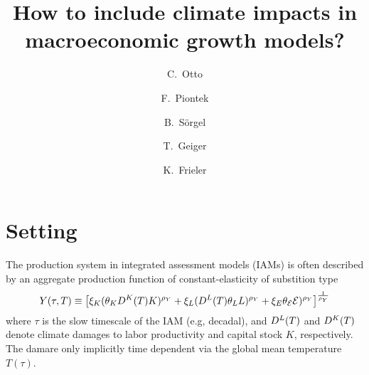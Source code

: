 \documentclass[preprint,3p,authoryear]{elsarticle}
\begin{document}

\begin{frontmatter}

  \title{How to include climate impacts in macroeconomic growth models?}

\author[PIK]{C.~Otto}


\author[PIK]{F.~Piontek}
\author[PIK]{B.~Sörgel}
\author[PIK]{T.~Geiger}
\author[PIK]{K.~Frieler}


\address[PIK]{Potsdam Institute for Climate Impact Research, Potsdam, Germany}




\end{frontmatter}



\section{Setting}
\label{sec:set}
The production system in integrated assessment models (IAMs) is often described by an aggregate production function of constant-elasticity of substition type
\begin{equation}
  \label{eq:CD}
  Y(\tau,T)\equiv \left[\xi_K(\theta_K D^K(T)K)^{\rho_Y}+\xi_L(D^L(T)\theta_LL)^{\rho_Y}+\xi_E\theta_{\mathcal{E}}\mathcal{E})^{\rho_Y}\right]^{\frac{1}{\rho_Y}}
\end{equation}
where $\tau$ is the slow timescale of the IAM (e.g, decadal), and $D^L(T)$ and $D^K(T)$ denote climate damages to labor productivity and capital stock $K$, respectively. The damare only implicitly time dependent via the global mean temperature $T(\tau)$.
\end{document}
